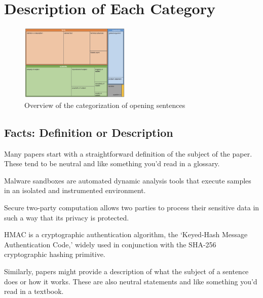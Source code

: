 \documentclass[sigconf]{acmart}
\begin{document}

	\maketitle
	
\section{Description of Each Category}
\begin{figure}[t]
	\centering
	\includegraphics[width=0.47\textwidth]{image.png}
	\caption{Overview of the categorization of opening sentences}
	\label{fig:overview}
\end{figure}
\subsection{Facts: Definition or Description}
	
Many papers start with a straightforward definition of the subject of the paper. These tend to be neutral and like something you’d read in a glossary.
	
Malware sandboxes are automated dynamic analysis tools that execute samples in an isolated and instrumented environment.
	
Secure two-party computation allows two parties to process their sensitive data in such a way that its privacy is protected.
	
	HMAC is a cryptographic authentication algorithm, the ‘Keyed-Hash Message Authentication Code,’ widely used in conjunction with the SHA-256 cryptographic hashing primitive.
	
	Similarly, papers might provide a description of what the subject of a sentence does or how it works. These are also neutral statements and like something you’d read in a textbook. 
	
\end{document}
